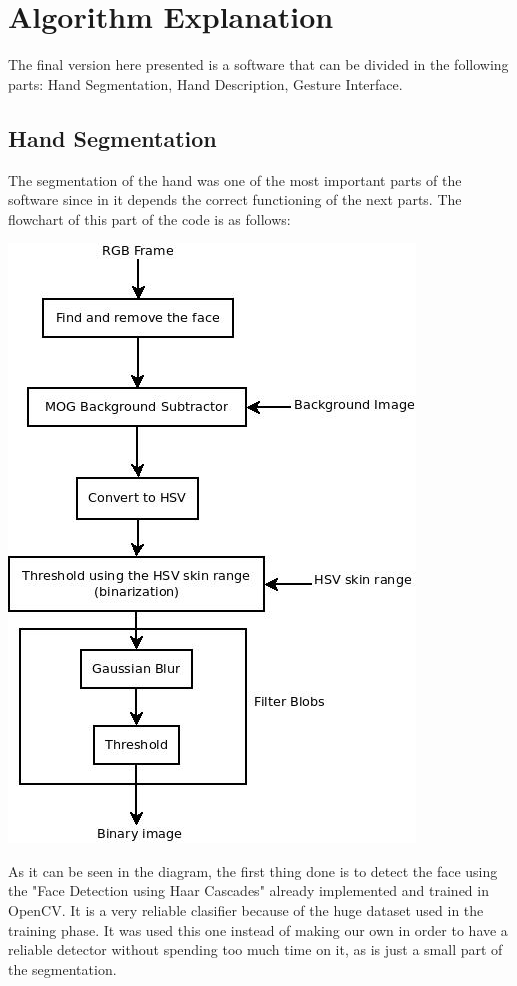 \section{Algorithm Explanation}

The final version here presented is a software that can be divided in the following parts: Hand Segmentation, Hand Description, Gesture Interface.

\subsection{Hand Segmentation}
The segmentation of the hand was one of the most important parts of the software since in it depends the correct functioning of the next parts. 
The flowchart of this part of the code is as follows: 

\begin{center}
 \includegraphics[scale=0.4]{../hand_filter.jpeg} 
\end{center} 
 
As it can be seen in the diagram, the first thing done is to detect the face using the "Face Detection using Haar Cascades" already implemented and trained in OpenCV. It is a very reliable clasifier because of the huge dataset used in the training phase. It was used this one instead of making our own in order to have a reliable detector without spending too much time on it, as is just a small part of the segmentation. 


